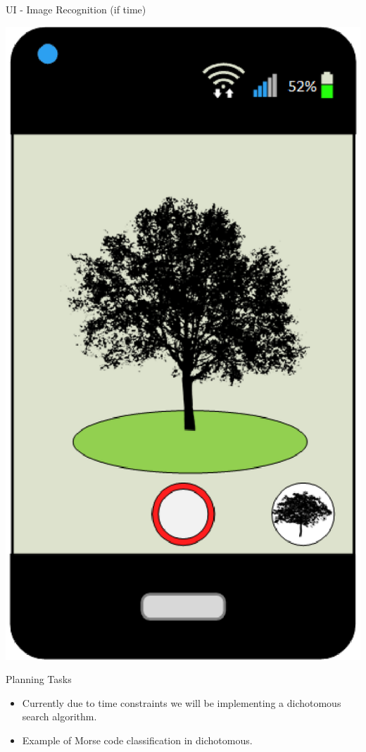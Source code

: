 \documentclass{beamer}
\begin{document}
\begin{frame}{UI - Image Recognition (if time)}
\begin{center}\includegraphics[scale=.5]{Photo-Id.eps}\end{center}
\end{frame}
\begin{frame}{Planning}
Tasks
\begin{itemize}
\item Currently due to time constraints we will be implementing a dichotomous search algorithm.
\item Example of Morse code classification in dichotomous.
\end{itemize}
\end{frame}
\end{document}
